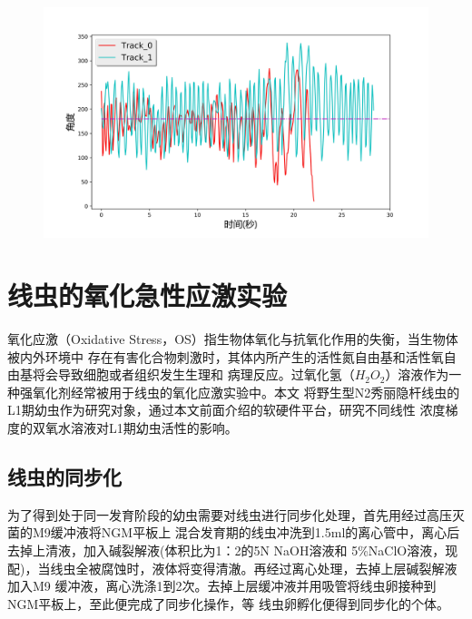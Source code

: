 \begin{figure}[!htp]    
	\centering    
	\includegraphics[width=1\linewidth]{figure/chap3/angle.jpg}    
\end{figure}
\section{线虫的氧化急性应激实验}
	氧化应激（Oxidative Stress，OS）指生物体氧化与抗氧化作用的失衡，当生物体被内外环境中
	存在有害化合物刺激时，其体内所产生的活性氮自由基和活性氧自由基将会导致细胞或者组织发生生理和
	病理反应。过氧化氢（$H_2O_2$）溶液作为一种强氧化剂经常被用于线虫的氧化应激实验中。本文
	将野生型N2秀丽隐杆线虫的L1期幼虫作为研究对象，通过本文前面介绍的软硬件平台，研究不同线性
	浓度梯度的双氧水溶液对L1期幼虫活性的影响。
\subsection{线虫的同步化}
	为了得到处于同一发育阶段的幼虫需要对线虫进行同步化处理，首先用经过高压灭菌的M9缓冲液将NGM平板上
	混合发育期的线虫冲洗到1.5ml的离心管中，离心后去掉上清液，加入碱裂解液(体积比为1：2的5N NaOH溶液和
	5\%NaClO溶液，现配)，当线虫全被腐蚀时，液体将变得清澈。再经过离心处理，去掉上层碱裂解液加入M9
	缓冲液，离心洗涤1到2次。去掉上层缓冲液并用吸管将线虫卵接种到NGM平板上，至此便完成了同步化操作，等
	线虫卵孵化便得到同步化的个体。
